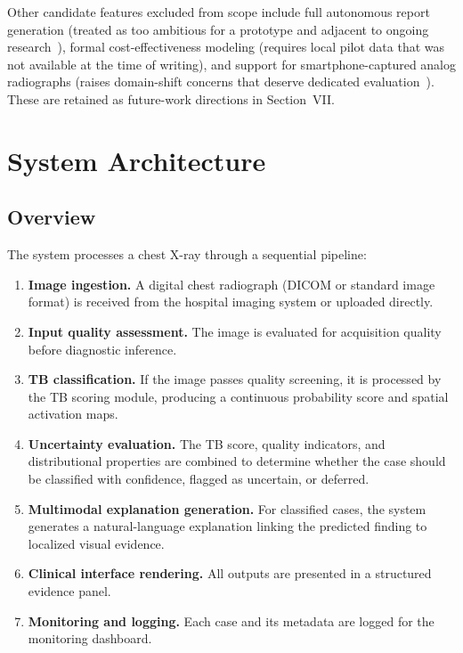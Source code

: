\documentclass[conference, letterpaper]{IEEEtran}
\begin{document}
Other candidate features excluded from scope include full autonomous report generation (treated as too ambitious for a prototype and adjacent to ongoing research~\cite{siemens_llm_cxr_2023, lee2024cxr_llava}), formal cost-effectiveness modeling (requires local pilot data that was not available at the time of writing), and support for smartphone-captured analog radiographs (raises domain-shift concerns that deserve dedicated evaluation~\cite{nasser2023photographed}). These are retained as future-work directions in Section~VII.
\section{System Architecture}

\subsection{Overview}

The system processes a chest X-ray through a sequential pipeline:

\begin{enumerate}
    \item \textbf{Image ingestion.} A digital chest radiograph (DICOM or standard image format) is received from the hospital imaging system or uploaded directly.
    \item \textbf{Input quality assessment.} The image is evaluated for acquisition quality before diagnostic inference.
    \item \textbf{TB classification.} If the image passes quality screening, it is processed by the TB scoring module, producing a continuous probability score and spatial activation maps.
    \item \textbf{Uncertainty evaluation.} The TB score, quality indicators, and distributional properties are combined to determine whether the case should be classified with confidence, flagged as uncertain, or deferred.
    \item \textbf{Multimodal explanation generation.} For classified cases, the system generates a natural-language explanation linking the predicted finding to localized visual evidence.
    \item \textbf{Clinical interface rendering.} All outputs are presented in a structured evidence panel.
    \item \textbf{Monitoring and logging.} Each case and its metadata are logged for the monitoring dashboard.
\end{enumerate}
\end{document}
